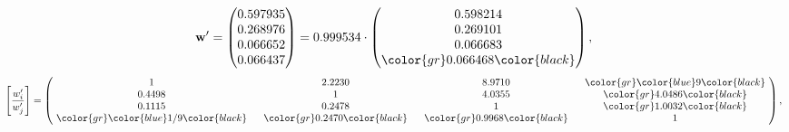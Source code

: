 \begin{example}
\begin{equation*}
\mathbf{w}^{\prime} =
\begin{pmatrix}
0.597935\\
0.268976\\
0.066652\\
0.066437
\end{pmatrix} =
0.999534\cdot
\begin{pmatrix}
0.598214\\
0.269101\\
0.066683\\
\color{gr} 0.066468\color{black}
\end{pmatrix},
\end{equation*}
\begin{equation*}
\left[ \frac{{w}^{\prime}_i}{{w}^{\prime}_j} \right] =
\begin{pmatrix}
$\,\,$ 1 $\,\,$ & $\,\,$2.2230$\,\,$ & $\,\,$8.9710$\,\,$ & $\,\,$\color{gr} \color{blue} 9\color{black} $\,\,$ \\
$\,\,$0.4498$\,\,$ & $\,\,$ 1 $\,\,$ & $\,\,$4.0355$\,\,$ & $\,\,$\color{gr} 4.0486\color{black}   $\,\,$ \\
$\,\,$0.1115$\,\,$ & $\,\,$0.2478$\,\,$ & $\,\,$ 1 $\,\,$ & $\,\,$\color{gr} 1.0032\color{black}  $\,\,$ \\
$\,\,$\color{gr} \color{blue}  1/9\color{black} $\,\,$ & $\,\,$\color{gr} 0.2470\color{black} $\,\,$ & $\,\,$\color{gr} 0.9968\color{black} $\,\,$ & $\,\,$ 1  $\,\,$ \\
\end{pmatrix},
\end{equation*}
\end{example}
\newpage

